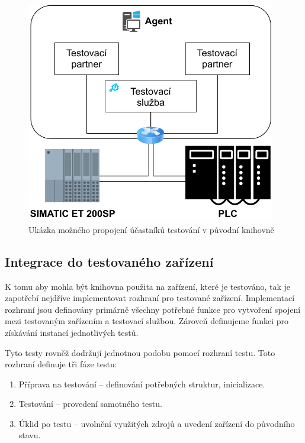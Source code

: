 \begin{figure}[htbp]
    \centering 
    \includegraphics[width=0.97\textwidth]{assets/img/bp_assets/devicemodel.pdf}
    \caption{Ukázka možného propojení účastníků testování v původní knihovně}
    \label{fig:bp_devicemodel}
\end{figure}


\subsection{Integrace do testovaného zařízení}

K tomu aby mohla být knihovna použita na zařízení, které je testováno, tak je zapotřebí nejdříve implementovat rozhraní pro testované zařízení. Implementací rozhraní jsou definovány primárně všechny potřebné funkce pro vytvoření spojení mezi testovaným zařízením a testovací službou. Zároveň definujeme funkci pro získávání instancí jednotlivých testů. 

Tyto testy rovněž dodržují jednotnou podobu pomocí rozhraní testu. Toto rozhraní definuje tři fáze testu:

\begin{enumerate}
    \item Příprava na testování -- definování potřebných struktur, inicializace.
    \item Testování -- provedení samotného testu.
    \item Úklid po testu -- uvolnění využitých zdrojů a uvedení zařízení do původního stavu.
\end{enumerate}

